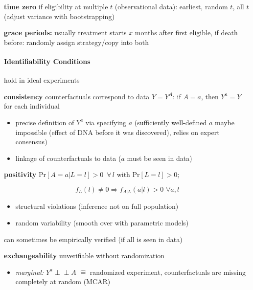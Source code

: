\documentclass[8pt,twoside]{extarticle}
\newcommand{\indep}{\perp \!\!\! \perp}
\begin{document}
\begin{multicols}{2}
 \textbf{time zero} if eligibility at multiple $t$ (observational data):
earliest, random $t$, all $t$ (adjust variance with bootstrapping)

 \textbf{grace periods:} usually treatment starts $x$ months after first eligible, if death before: randomly assign strategy/copy into both




\paragraph{Identifiability Conditions} hold in ideal experiments

 \textbf{consistency} counterfactuals correspond to data $Y=Y^A$: \newline
 if $A=a$, then $Y^a=Y$ for each individual
 
\begin{itemize}[itemsep=0em, topsep=0pt, partopsep=0pt,parsep=0pt, leftmargin=1.5em]
\item precise definition of $Y^a$ via specifying $a$ (sufficiently well-defined $a$ maybe impossible (effect of DNA before it was discovered), relies on expert consensus)
\item linkage of counterfactuals to data ($a$ must be seen in data) 
\end{itemize}

 \textbf{positivity} $\mathrm{Pr}\left[A=a|L=l\right] >0 \,\,\, \forall \, l \text{ with } \mathrm{Pr}\left[L=l\right]>0$; \vspace{-1.8em}
 
 $$f_L(l)\neq 0 \Rightarrow f_{A|L}(a|l)>0 \,\, \forall a,l$$

\vspace{-.2em}
\begin{itemize}[itemsep=0em, topsep=0pt, partopsep=0pt,parsep=0pt, leftmargin=1.5em]
\item structural violations (inference not on full population)
\item random variability (smooth over with parametric models)
\end{itemize}
 can sometimes be empirically verified (if all is seen in data)

 \textbf{exchangeability} unverifiable without randomization
\begin{itemize}[itemsep=0em, topsep=0pt, partopsep=0pt,parsep=0pt, leftmargin=1.5em]
\item \textit{marginal:} $Y^a \indep A$ $\widehat{=}$ randomized experiment, \newline counterfactuals are missing completely at random (MCAR)


\end{itemize}
\end{multicols}
\end{document}
